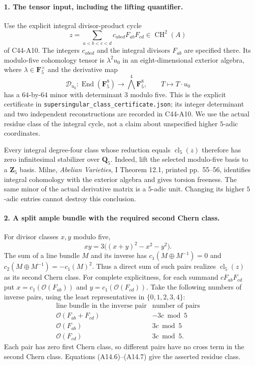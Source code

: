 \documentclass[11pt]{article}
\theoremstyle{remark}\newtheorem{remark}[theorem]{Remark}
\begin{document}
\paragraph{1. The tensor input, including the lifting quantifier.}
Use the explicit integral divisor-product cycle
\[
 z=\sum_{a<b<c<d}c_{abcd}F_{ab}F_{cd}\in\operatorname{CH}^2(A)
\]
of C44-A10. The integers $c_{abcd}$ and the integral divisors
$F_{ab}$ are specified there. Its modulo-five cohomology tensor
is $\lambda^2u_0$ in an eight-dimensional exterior algebra, where
$\lambda\in\mathbf F_5^\times$ and the derivative map
\[
 \mathcal D_{u_0}:\operatorname{End}(\mathbf F_5^8)
                     \longrightarrow\bigwedge^4\mathbf F_5^8,
 \qquad T\longmapsto T\cdot u_0
                                                               \tag{A14.5}
\]
has a $64$-by-$64$ minor with determinant $3$ modulo five.
This is the explicit certificate in
\texttt{supersingular\_class\_certificate.json}; its integer
determinant and two independent reconstructions are recorded in
C44-A10. We use the actual residue class of the integral cycle,
not a claim about unspecified higher $5$-adic coordinates.

Every integral degree-four class whose reduction equals
$\operatorname{cl}_5(z)$ therefore has zero infinitesimal
stabilizer over $\mathbf Q_5$. Indeed, lift the selected
modulo-five basis to a $\mathbf Z_5$ basis. Milne,
\emph{Abelian Varieties}, I Theorem 12.1, printed pp.~55--56,
identifies integral cohomology with the exterior algebra and
gives torsion freeness. The same minor of the actual derivative
matrix is a $5$-adic unit. Changing its higher $5$-adic entries
cannot destroy this conclusion.

\paragraph{2. A split ample bundle with the required second Chern class.}
For divisor classes $x,y$ modulo five,
\[
                  xy=3\big((x+y)^2-x^2-y^2\big).
                                                               \tag{A14.6}
\]
The sum of a line bundle $M$ and its inverse has
$c_1(M\oplus M^{-1})=0$ and $c_2(M\oplus M^{-1})=-c_1(M)^2$.
Thus a direct sum of such pairs realizes
$\operatorname{cl}_5(z)$ as its second Chern class. For complete
explicitness, for each summand $cF_{ab}F_{cd}$ put
$x=c_1(\mathcal O(F_{ab}))$ and $y=c_1(\mathcal O(F_{cd}))$.
Take the following numbers of inverse pairs, using the least
representatives in $\{0,1,2,3,4\}$:
\[
 \begin{array}{c|c}
 \text{line bundle in the inverse pair}&\text{number of pairs}\\ \hline
 \mathcal O(F_{ab}+F_{cd})&-3c\bmod5\\
 \mathcal O(F_{ab})&3c\bmod5\\
 \mathcal O(F_{cd})&3c\bmod5 .
 \end{array}
                                                               \tag{A14.7}
\]
Each pair has zero first Chern class, so different pairs have no
cross term in the second Chern class. Equations (A14.6)--(A14.7)
give the asserted residue class.
\end{document}
